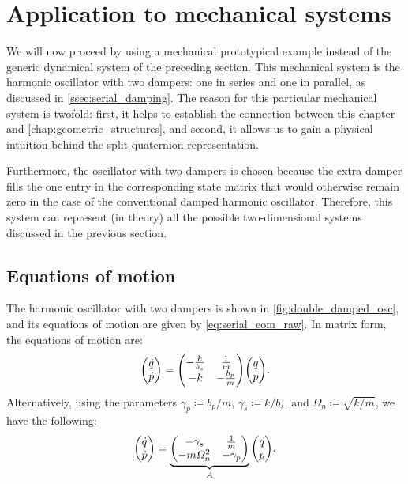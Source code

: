 \section{Application to mechanical systems}
\label{sec:mechanical}
We will now proceed by using a mechanical prototypical example instead of the generic dynamical system of the preceding section. This mechanical system is the harmonic oscillator with two dampers: one in series and one in parallel, as discussed in \cref{ssec:serial_damping}. The reason for this particular mechanical system is twofold: first, it helps to establish the connection between this chapter and \cref{chap:geometric_structures}, and second, it allows us to gain a physical intuition behind the split-quaternion representation. 

Furthermore, the oscillator with two dampers is chosen because the extra damper fills the one entry in the corresponding state matrix that would otherwise remain zero in the case of the conventional damped harmonic oscillator. Therefore, this system can represent (in theory) all the possible two-dimensional systems discussed in the previous section.

\subsection{Equations of motion}
The harmonic oscillator with two dampers is shown in \cref{fig:double_damped_osc}, and its equations of motion are given by \cref{eq:serial_eom_raw}. In matrix form, the equations of motion are:
\begin{equation*}
    \mqty(\dot{q}\\\dot{p}) = \mqty(-\tfrac{k}{b_s} & \tfrac{1}{m} \\ -k & - \tfrac{b_p}{m})\mqty(q \\ p).
\end{equation*}
Alternatively, using the parameters \(\gamma_p \coloneq b_p/m\), \(\gamma_s \coloneq k/b_s\), and \(\Omega_n \coloneq \sqrt{k/m}\), we have the following:
\begin{equation}
    \mqty(\dot{q}\\\dot{p}) = \underbrace{\mqty(-\gamma_s & \frac{1}{m} \\ -m\Omega_n^2 & - \gamma_p)}_A \mqty(q \\ p).
    \label{eq:ddho_eom}
\end{equation}

